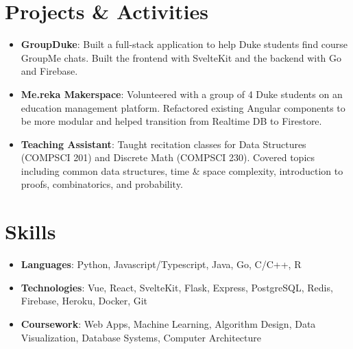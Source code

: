 \documentclass[letterpaper,10pt]{article}
\newcommand{\resumeItem}[2]{
  \item\small{
    \textbf{#1}{: #2 \vspace{-2pt}}
  }
}
\newcommand{\resumeSubItem}[2]{\resumeItem{#1}{#2}\vspace{-4pt}}
\newcommand{\resumeSubHeadingListStart}{\begin{itemize}[leftmargin=*]}
\newcommand{\resumeSubHeadingListEnd}{\end{itemize}}
\begin{document}
\section{Projects \& Activities}
  \resumeSubHeadingListStart
    \resumeSubItem{GroupDuke}
      {Built a full-stack application to help Duke students find course GroupMe chats. Built the frontend with SvelteKit and the backend with Go and Firebase.}
    \resumeSubItem{Me.reka Makerspace}
      {Volunteered with a group of 4 Duke students on an education management platform. Refactored existing Angular components to be more modular and helped transition from Realtime DB to Firestore.}
    \resumeSubItem{Teaching Assistant}
      {Taught recitation classes for Data Structures (COMPSCI 201) and Discrete Math (COMPSCI 230). Covered topics including common data structures, time \& space complexity, introduction to proofs, combinatorics, and probability.}
  \resumeSubHeadingListEnd


 \section{Skills}
  \resumeSubHeadingListStart
    \resumeSubItem{Languages}{Python, Javascript/Typescript, Java, Go, C/C++, R}
    \resumeSubItem{Technologies}{Vue, React, SvelteKit, Flask, Express, PostgreSQL, Redis, Firebase, Heroku, Docker, Git}
    \resumeSubItem{Coursework}{Web Apps, Machine Learning, Algorithm Design, Data Visualization, Database Systems, Computer Architecture}
  \resumeSubHeadingListEnd


\end{document}

